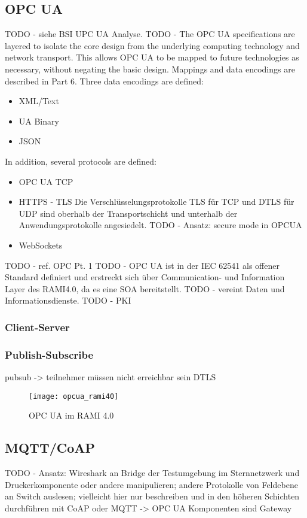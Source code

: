 \subsection{\ac{OPC UA}}
\label{Analyse:OPCUA}
TODO - siehe BSI UPC UA Analyse.
TODO - The OPC UA specifications are layered to isolate the core design from the underlying computing technology and network transport. This allows OPC UA to be mapped to future technologies as necessary, without negating the basic design. Mappings and data encodings are described in Part 6. Three data encodings are defined:
\begin{itemize}
    \item XML/Text
    \item UA Binary
    \item JSON
\end{itemize}
In addition, several protocols are defined:
\begin{itemize}
    \item OPC UA TCP
    \item HTTPS - TLS Die Verschlüsselungsprotokolle \ac{TLS} für \ac{TCP} und \ac{DTLS} für \ac{UDP} sind oberhalb der Transportschicht und unterhalb der Anwendungsprotokolle angesiedelt. TODO - Ansatz: secure mode in OPCUA
    \item WebSockets
\end{itemize}

TODO - ref. OPC Pt. 1
TODO - \ac{OPC UA} ist in der \ac{IEC} 62541 als offener Standard definiert und erstreckt sich über Communication- und Information Layer des \ac{RAMI4.0}, da es eine \ac{SOA} bereitstellt. 
TODO - vereint Daten und Informationsdienste. 
TODO - PKI

\subsubsection{Client-Server}
\subsubsection{Publish-Subscribe}
pubsub -> teilnehmer müssen nicht erreichbar sein
\ac{DTLS}

\begin{figure}[h]
    \centering
    \texttt{[image: opcua\_rami40]}
    \caption{OPC UA im RAMI 4.0}
    \label{Kap3:OPC UA im RAMI 4.0}
  \end{figure}
\clearpage

\subsection{\ac{MQTT}/\ac{CoAP}}
TODO - Ansatz: Wireshark an Bridge der Testumgebung im Sternnetzwerk und Druckerkomponente oder andere manipulieren; andere Protokolle von Feldebene an Switch auslesen; vielleicht hier nur beschreiben und in den höheren Schichten durchführen mit CoAP oder MQTT -> OPC UA Komponenten sind Gateway

